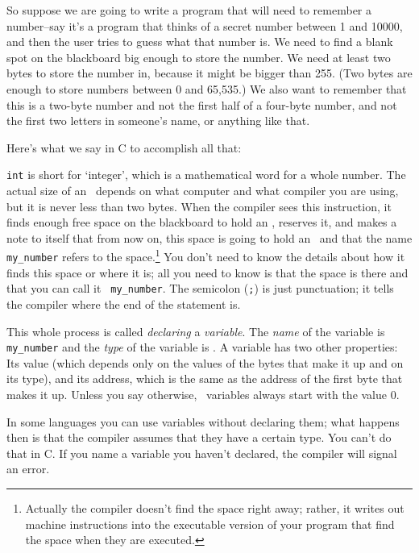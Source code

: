     So suppose we are going to write a program that will need to
remember a number--say it's a program that thinks of a secret number
between 1 and 10000, and then the user tries to guess what that number
is.  We need to find a blank spot on the blackboard big enough to store
the number.  We need at least two bytes to store the number in, because
it might be bigger than 255.  (Two bytes are enough to store numbers
between 0 and 65,535.)  We also want to remember that this is a two-byte
number and not the first half of a four-byte number, and not the first
two letters in someone's name, or anything like that.

    Here's what we say in C to accomplish all that:

\begin{flushleft}
\verb%    int my_number;%
\end{flushleft}

    {\tt int} is short for `integer', which is a mathematical word for a
whole number.  The actual size of an \int\ depends on what computer
and what compiler you are using, but it is never less than two bytes.
When the compiler sees this instruction, it finds enough free space on
the blackboard to hold an \int, reserves it, and makes a note to
itself that from now on, this space is going to hold an \int\ and
that the name {\tt my\_number} refers to the space.\footnote{Actually the
compiler doesn't find the space right away; rather, it writes out
machine instructions into the executable version of your program that
find the space when they are executed.} You don't need to know the
details about how it finds this space or where it is; all you need to
know is that the space is there and that you can call it {\tt
my\_number}.  The semicolon ({\tt;}) is just punctuation; it tells the
compiler where the end of the statement is.

    This whole process is called {\em declaring}\/ a {\em variable}\/.
The {\em name}\/ of the variable is {\tt my\_number} and the {\em type}\/
of the variable is \int.  A variable has two other properties:  Its
value (which depends only on the values of the bytes that make it up and
on its type), and its address, which is the same as the address of the
first byte that makes it up.  Unless you say otherwise, \int\
variables always start with the value 0.

    In some languages you can use variables without declaring them; what
happens then is that the compiler assumes that they have a certain type.
You can't do that in C.  If you name a variable you haven't declared,
the compiler will signal an error.


